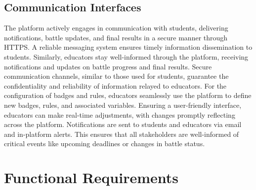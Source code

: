 \subsection{Communication Interfaces}
\label{subsec:communication_interfaces}%
The platform actively engages in communication with students, delivering notifications, battle updates, and final results in a secure manner through HTTPS. A reliable messaging system ensures timely information dissemination to students.
Similarly, educators stay well-informed through the platform, receiving notifications and updates on battle progress and final results. Secure communication channels, similar to those used for students, guarantee the confidentiality and reliability of information relayed to educators.
For the configuration of badges and rules, educators seamlessly use the platform to define new badges, rules, and associated variables. Ensuring a user-friendly interface, educators can make real-time adjustments, with changes promptly reflecting across the platform.
Notifications are sent to students and educators via email and in-platform alerts. This ensures that all stakeholders are well-informed of critical events like upcoming deadlines or changes in battle status.

\section{Functional Requirements}
\label{sec:functional_requirements}%


